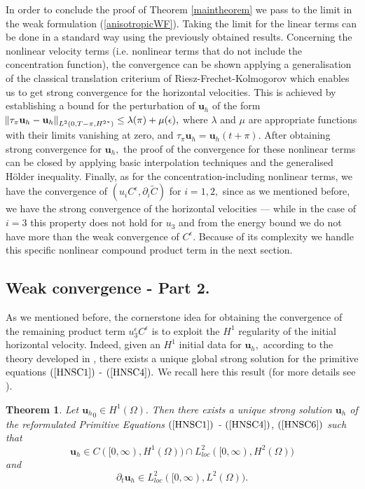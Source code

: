 \documentclass[11pt]{article}
\newtheorem{theorem}{Theorem}
\begin{document}
  In order to conclude the proof of Theorem \ref{maintheorem} we pass to the limit in the weak formulation (\ref{anisotropicWF}). Taking the limit for the linear terms can be done in a standard way using the previously obtained results.
   Concerning the nonlinear velocity terms (i.e. nonlinear terms that do not include the concentration function), the convergence can be shown applying a generalisation of the classical translation criterium of Riesz-Frechet-Kolmogorov which enables us to get strong convergence for the horizontal velocities. This is achieved by establishing a bound for the perturbation of $\mathbf{u}_h$ of the form $\norm{\tau_\pi \mathbf{u}_h - \mathbf{u}_h}_{L^2(0,T-\pi, {H^2}^*)} \leq \lambda(\pi) + \mu(\epsilon),$ where $\lambda$ and $\mu$ are appropriate functions with their limits vanishing at zero, and $\tau_\pi \mathbf{u}_h = \mathbf{u}_h (t+\pi) $. After obtaining strong convergence for $\mathbf{u}_h,$ the proof of the convergence for these nonlinear terms can be closed by applying basic interpolation techniques and the generalised H\"older inequality. 
  Finally, as for the concentration-including nonlinear terms, we have the convergence of $(u_i C^\epsilon, \partial_i \tilde{C})$ for $i=1,2,$ since as we mentioned before, we have the strong convergence of the horizontal velocities --- while in the case of $i=3$ this property does not hold for $u_3$ and from the energy bound we do not have more than the weak convergence of $C^\epsilon$. Because of its complexity we handle this specific nonlinear compound product term in the next section.
  
  \subsection{Weak convergence - Part 2.}
  
  As we mentioned before, the cornerstone idea for obtaining the convergence of the remaining product term $u_3^\epsilon C^\epsilon$ is to exploit the $H^1$ regularity of the initial horizontal velocity. Indeed, given an $H^1$ initial data for $\mathbf{u}_h,$ according to the theory developed in \cite{cao2007global}, there exists a unique global strong solution for the primitive equations $(\ref{HNSC1})$ - $(\ref{HNSC4}).$ We recall here this result (for more details see \cite{cao2007global}).
  
  \begin{theorem} \label{PE3DWellPosedness}
    Let ${\mathbf{u}_h}_0 \in H^1(\Omega).$ Then there exists a unique strong solution $\mathbf{u}_h$ of the reformulated Primitive Equations $(\ref{HNSC1})$ - $(\ref{HNSC4})$, $(\ref{HNSC6})$ such that $$\mathbf{u}_h \in C([0, \infty), H^1(\Omega)) \cap L^2_{loc}([0, \infty), H^2(\Omega))$$ and $$\partial_t \mathbf{u}_h \in L^2_{loc} ([0,\infty), L^2(\Omega)).$$
  \end{theorem}
  
\end{document}
